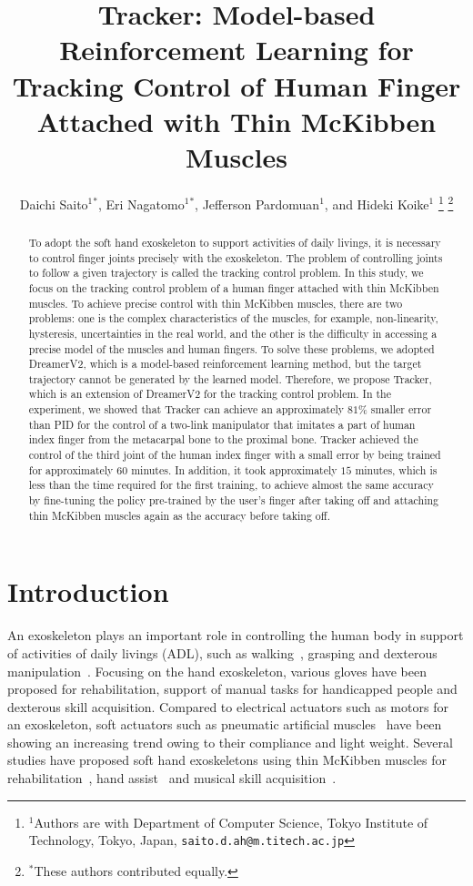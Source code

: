 \documentclass[letterpaper, 10 pt, conference]{ieeeconf}  %
\title{\LARGE \bf
Tracker: Model-based Reinforcement Learning for Tracking Control of Human Finger Attached with Thin McKibben Muscles
}
\author{Daichi Saito$^{1} {}^\ast$, Eri Nagatomo$^{1} {}^\ast$, Jefferson Pardomuan$^{1}$, and Hideki Koike$^{1}$  %
\thanks{$^{1}$Authors are with Department of Computer Science,
        Tokyo Institute of Technology, Tokyo, Japan,
        {\tt\small saito.d.ah@m.titech.ac.jp}}%
\thanks{${}^\ast$These authors contributed equally.}%
}
\begin{document}

\maketitle
\thispagestyle{empty}
\pagestyle{empty}


\begin{abstract}
To adopt the soft hand exoskeleton to support activities of daily livings, it is necessary to control finger joints precisely with the exoskeleton. The problem of controlling joints to follow a given trajectory is called the tracking control problem. In this study, we focus on the tracking control problem of a human finger attached with thin McKibben muscles. To achieve precise control with thin McKibben muscles, there are two problems: one is the complex characteristics of the muscles, for example, non-linearity, hysteresis, uncertainties in the real world, and the other is the difficulty in accessing a precise model of the muscles and human fingers. To solve these problems, we adopted DreamerV2, which is a model-based reinforcement learning method, but the target trajectory cannot be generated by the learned model. Therefore, we propose Tracker, which is an extension of DreamerV2 for the tracking control problem. In the experiment, we showed that Tracker can achieve an approximately $81$\% smaller error than PID for the control of a two-link manipulator that imitates a part of human index finger from the metacarpal bone to the proximal bone. Tracker achieved the control of the third joint of the human index finger with a small error by being trained for approximately $60$ minutes. 
In addition, it took approximately $15$ minutes, which is less than the time required for the first training, to achieve almost the same accuracy by fine-tuning the policy pre-trained by the user’s finger after taking off and attaching thin McKibben muscles again as the accuracy before taking off.
\end{abstract}


\section{Introduction}
An exoskeleton plays an important role in controlling the human body in support of activities of daily livings (ADL), such as walking~\cite{pinto2020performance}, grasping and dexterous manipulation~\cite{gull2020review, du2021review}. Focusing on the hand exoskeleton, various gloves have been proposed for rehabilitation, support of manual tasks for handicapped people and dexterous skill acquisition. Compared to electrical actuators such as motors for an exoskeleton, soft actuators such as pneumatic artificial muscles~\cite{suzumori2015new, kurumaya2017design} have been showing an increasing trend owing to their compliance and light weight. Several studies have proposed soft hand exoskeletons using thin McKibben muscles for rehabilitation~\cite{wang2020sensor}, hand assist~\cite{koizumi2020soft} and musical skill acquisition~\cite{takahashi2020soft}.
\end{document}
